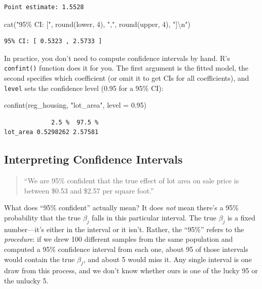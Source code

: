 \documentclass[
  letterpaper,
  DIV=11,
  numbers=noendperiod]{scrreprt}
\newenvironment{Shaded}{\begin{snugshade}}{\end{snugshade}}
\newcommand{\AttributeTok}[1]{\textcolor[rgb]{0.40,0.45,0.13}{#1}}
\newcommand{\DecValTok}[1]{\textcolor[rgb]{0.68,0.00,0.00}{#1}}
\newcommand{\FloatTok}[1]{\textcolor[rgb]{0.68,0.00,0.00}{#1}}
\newcommand{\FunctionTok}[1]{\textcolor[rgb]{0.28,0.35,0.67}{#1}}
\newcommand{\NormalTok}[1]{\textcolor[rgb]{0.00,0.23,0.31}{#1}}
\newcommand{\SpecialCharTok}[1]{\textcolor[rgb]{0.37,0.37,0.37}{#1}}
\newcommand{\StringTok}[1]{\textcolor[rgb]{0.13,0.47,0.30}{#1}}
\begin{document}
\begin{verbatim}
Point estimate: 1.5528 
\end{verbatim}

\begin{Shaded}
\begin{Highlighting}[]
\FunctionTok{cat}\NormalTok{(}\StringTok{"95\% CI: ["}\NormalTok{, }\FunctionTok{round}\NormalTok{(lower, }\DecValTok{4}\NormalTok{), }\StringTok{","}\NormalTok{, }\FunctionTok{round}\NormalTok{(upper, }\DecValTok{4}\NormalTok{), }\StringTok{"]}\SpecialCharTok{\textbackslash{}n}\StringTok{"}\NormalTok{)}
\end{Highlighting}
\end{Shaded}

\begin{verbatim}
95% CI: [ 0.5323 , 2.5733 ]
\end{verbatim}

In practice, you don't need to compute confidence intervals by hand. R's
\texttt{confint()} function does it for you. The first argument is the
fitted model, the second specifies which coefficient (or omit it to get
CIs for all coefficients), and \texttt{level} sets the confidence level
(0.95 for a 95\% CI):

\begin{Shaded}
\begin{Highlighting}[]
\FunctionTok{confint}\NormalTok{(reg\_housing, }\StringTok{"lot\_area"}\NormalTok{, }\AttributeTok{level =} \FloatTok{0.95}\NormalTok{)}
\end{Highlighting}
\end{Shaded}

\begin{verbatim}
             2.5 %  97.5 %
lot_area 0.5298262 2.57581
\end{verbatim}

\subsection{Interpreting Confidence
Intervals}\label{interpreting-confidence-intervals}

\begin{quote}
``We are 95\% confident that the true effect of lot area on sale price
is between \$0.53 and \$2.57 per square foot.''
\end{quote}

What does ``95\% confident'' actually mean? It does \emph{not} mean
there's a 95\% probability that the true \(\beta_j\) falls in this
particular interval. The true \(\beta_j\) is a fixed number---it's
either in the interval or it isn't. Rather, the ``95\%'' refers to the
\emph{procedure}: if we drew 100 different samples from the same
population and computed a 95\% confidence interval from each one, about
95 of those intervals would contain the true \(\beta_j\), and about 5
would miss it. Any single interval is one draw from this process, and we
don't know whether ours is one of the lucky 95 or the unlucky 5.
\end{document}
